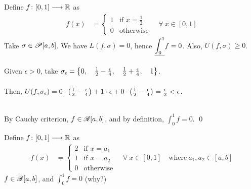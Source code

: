 \documentclass[a4paper]{book}
\begin{document}
\begin{exampleT} Define $f\colon [0,1] \longrightarrow \mathbb{R}$ as
\begin{align*}
f(x) &= \begin{cases}
1 & \text{if } x = \frac{1}{2} \\
0 & \text{otherwise}
\end{cases}\quad \forall\ x \in [0,1]
\end{align*}
Take $\sigma \in \mathscr{P}[a,b]$. We have $\displaystyle L(f, \sigma) = 0$, hence $\displaystyle \underline{\int_{0}^{1}} f = 0$. Also, $\displaystyle U(f, \sigma) \geq 0$. \\ \\
Given $\epsilon > 0$, take $\sigma_\epsilon = \qty{0,\quad \frac{1}{2} - \frac{\epsilon}{4},\quad \frac{1}{2} + \frac{\epsilon}{4},\quad 1}$. \\\\ Then, $U(f, \sigma_\epsilon) = 0 \cdot \qty(\frac{1}{2} - \frac{\epsilon}{4}) + 1 \cdot \epsilon + 0 \cdot \qty(\frac{1}{2} - \frac{\epsilon}{4}) = \frac{\epsilon}{2} < \epsilon$. 
\begin{figure}[h]
\centering
{}
\end{figure} \\
By Cauchy criterion, $f \in \mathscr{R}[a,b]$, and by definition, $\displaystyle \int_0^1 f = 0$. \qed
\end{exampleT}
\begin{exampleT}
Define $f\colon [0,1] \longrightarrow \mathbb{R}$ as
\begin{align*}
f(x) &= \begin{cases}
2 & \text{if } x = a_1 \\
1 & \text{if } x = a_2 \\
0 & \text{otherwise}
\end{cases}\quad \forall\ x \in [0,1] \quad \text{where}\ a_1, a_2 \in [a,b]
\end{align*}
$f \in \mathscr{R}[a,b]$, and $\displaystyle \int_0^1 f= 0$ (why?) 
\end{exampleT}
\end{document}
